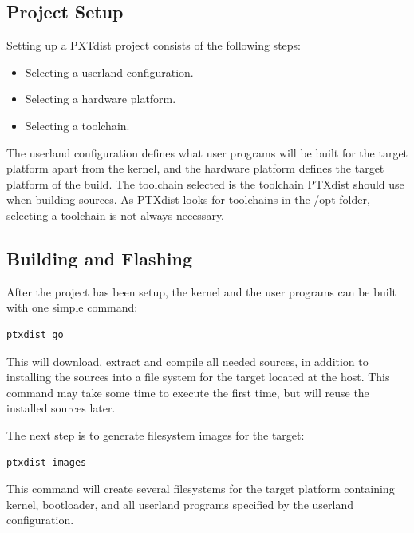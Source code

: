 \subsection{Project Setup}
Setting up a PXTdist project consists of the following steps:
\begin{itemize}
  \item Selecting a userland configuration.
  \item Selecting a hardware platform.
  \item Selecting a toolchain.
\end{itemize}
The userland configuration defines what user programs will be built for the target platform apart from the kernel, and the hardware platform defines the target platform of the build. The toolchain selected is the toolchain PTXdist should use when building sources. As PTXdist looks for toolchains in the /opt folder, selecting a toolchain is not always necessary.


\subsection{Building and Flashing}
After the project has been setup, the kernel and the user programs can be built with one simple command:
\lstset{style=lststyle-terminal}
\begin{lstlisting}
ptxdist go
\end{lstlisting}
This will download, extract and compile all needed sources, in addition to installing the sources into a file system for the target located at the host. This command may take some time to execute the first time, but will reuse the installed sources later.

The next step is to generate filesystem images for the target:
\lstset{style=lststyle-terminal}
\begin{lstlisting}
ptxdist images
\end{lstlisting}
This command will create several filesystems for the target platform containing kernel, bootloader, and all userland programs specified by the userland configuration. 

